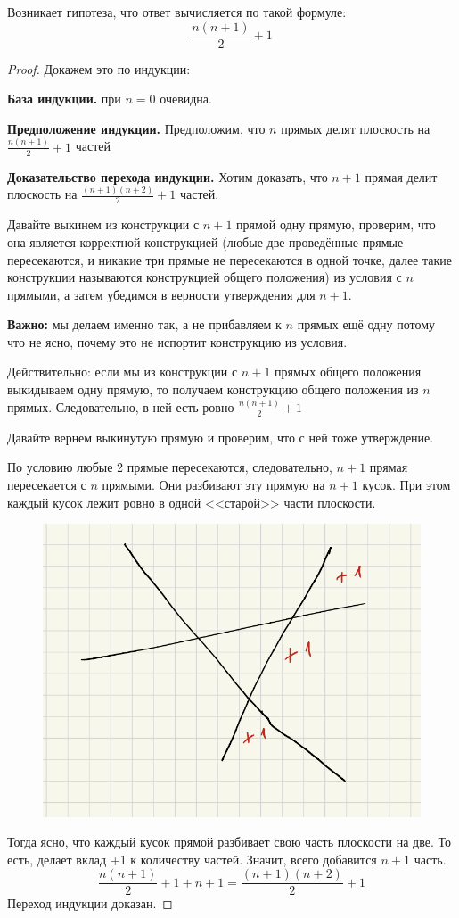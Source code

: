 Возникает гипотеза, что ответ вычисляется по такой формуле:
\[
\frac{n(n + 1)}{2} + 1
\]
\begin{proof}
Докажем это по индукции:

\textbf{База индукции.} при $n = 0$ очевидна.

\textbf{Предположение индукции.} Предположим, что $n$ прямых делят плоскость на $\frac{n(n+1)}{2} + 1$ частей

\textbf{Доказательство перехода индукции.} Хотим доказать, что $n + 1$ прямая делит плоскость на $\frac{(n+1)(n+2)}{2} + 1$ частей.

Давайте выкинем из конструкции с $n + 1$ прямой одну прямую, проверим, что она является корректной конструкцией (любые две проведённые прямые пересекаются, и никакие три прямые не пересекаются в одной точке, далее такие конструкции называются конструкцией общего положения) из условия с $n$ прямыми, а затем убедимся в верности утверждения для $n + 1$.

\textbf{Важно:} мы делаем именно так, а не прибавляем к $n$ прямых ещё одну потому что не ясно, почему это не испортит конструкцию из условия.

Действительно: если мы из конструкции с $n + 1$ прямых общего положения выкидываем одну прямую, то получаем конструкцию общего положения из $n$ прямых. Следовательно, в ней есть ровно $\frac{n(n+1)}{2} + 1$

Давайте вернем выкинутую прямую и проверим, что с ней тоже утверждение.

По условию любые 2 прямые пересекаются, следовательно, $n+1$ прямая пересекается с $n$ прямыми. Они разбивают эту прямую на $n + 1$ кусок. При этом каждый кусок лежит ровно в одной <<старой>> части плоскости. 

\begin{figure}[H]
    \centering
    \includegraphics[width=0.5\linewidth]{Figures/sem06_task2.png}
\end{figure}

Тогда ясно, что каждый кусок прямой разбивает свою часть плоскости на две. То есть, делает вклад +1 к количеству частей. Значит, всего добавится $n + 1$ часть.
\[
\frac{n(n+1)}{2} + 1 + n + 1 = \frac{(n+1)(n+2)}{2} + 1
\] 
Переход индукции доказан.
\end{proof}

